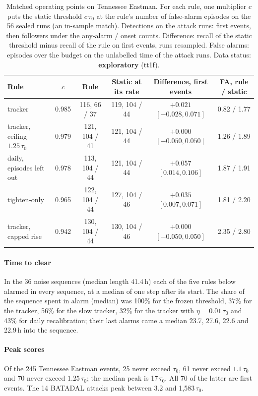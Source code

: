 \documentclass[letterpaper,twocolumn,10pt]{article}
\begin{document}
\begin{table}[t]
\caption{Matched operating points on Tennessee Eastman. For each rule, one multiplier $c$ puts the static
threshold $c\,\tau_0$ at the rule's number of false-alarm episodes on the 56 sealed runs (an in-sample
match). Detections on the attack runs: first events, then followers under the any-alarm / onset counts.
Difference: recall of the static threshold minus recall of the rule on first events, runs resampled.
False alarms: episodes over the budget on the unlabelled time of the attack runs. Data status:
\textbf{exploratory} (tt1f).}
\label{tab:matched}
\small
\begin{tabularx}{\textwidth}{@{}Lccccc@{}}
\toprule
Rule & $c$ & Rule & Static at its rate & Difference, first events & FA, rule / static \\
\midrule
tracker & 0.985 & 116, 66 / 37 & 119, 104 / 44 & $+0.021$ $[-0.028, 0.071]$ & 0.82 / 1.77 \\
tracker, ceiling $1.25\,\tau_0$ & 0.979 & 121, 104 / 41 & 121, 104 / 44 & $+0.000$ $[-0.050, 0.050]$ & 1.26 / 1.89 \\
daily, episodes left out & 0.978 & 113, 104 / 44 & 121, 104 / 44 & $+0.057$ $[0.014, 0.106]$ & 1.87 / 1.91 \\
tighten-only & 0.965 & 122, 104 / 44 & 127, 104 / 46 & $+0.035$ $[0.007, 0.071]$ & 1.81 / 2.20 \\
tracker, capped rise & 0.942 & 130, 104 / 44 & 130, 104 / 46 & $+0.000$ $[-0.050, 0.050]$ & 2.35 / 2.80 \\
\bottomrule
\end{tabularx}
\end{table}

\paragraph{Time to clear}
In the 36 noise sequences (median length 41.4\,h) each of the five rules below alarmed in every sequence, at a median of one step
after its start. The share
of the sequence spent in alarm (median) was 100\% for the frozen threshold, 37\% for the tracker, 56\% for
the slow tracker, 32\% for the tracker with $\eta = 0.01\,\tau_0$ and 43\% for daily recalibration; their last
alarms came a median 23.7, 27.6, 22.6 and 22.9\,h into the sequence.

\paragraph{Peak scores}
Of the 245 Tennessee Eastman events, 25 never exceed $\tau_0$, 61 never exceed $1.1\,\tau_0$ and 70 never exceed
$1.25\,\tau_0$; the median peak is 17\,$\tau_0$. All 70 of the latter are first events. The
14 BATADAL attacks peak between 3.2 and 1,583\,$\tau_0$.
\end{document}
